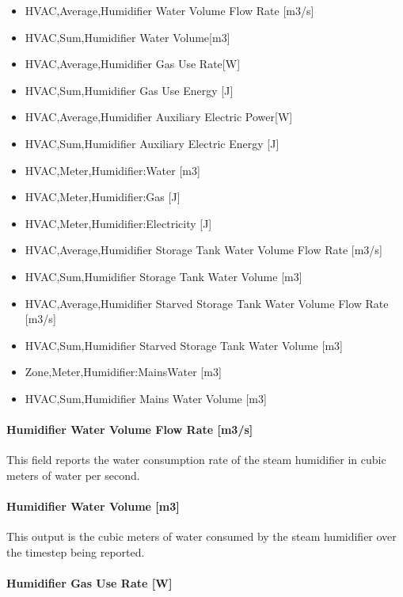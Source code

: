 \begin{itemize}
\tightlist
\item
  HVAC,Average,Humidifier Water Volume Flow Rate {[}m3/s{]}
\item
  HVAC,Sum,Humidifier Water Volume{[}m3{]}
\item
  HVAC,Average,Humidifier Gas Use Rate{[}W{]}
\item
  HVAC,Sum,Humidifier Gas Use Energy {[}J{]}
\item
  HVAC,Average,Humidifier Auxiliary Electric Power{[}W{]}
\item
  HVAC,Sum,Humidifier Auxiliary Electric Energy {[}J{]}
\item
  HVAC,Meter,Humidifier:Water {[}m3{]}
\item
  HVAC,Meter,Humidifier:Gas {[}J{]}
\item
  HVAC,Meter,Humidifier:Electricity {[}J{]}
\item
  HVAC,Average,Humidifier Storage Tank Water Volume Flow Rate {[}m3/s{]}
\item
  HVAC,Sum,Humidifier Storage Tank Water Volume {[}m3{]}
\item
  HVAC,Average,Humidifier Starved Storage Tank Water Volume Flow Rate {[}m3/s{]}
\item
  HVAC,Sum,Humidifier Starved Storage Tank Water Volume {[}m3{]}
\item
  Zone,Meter,Humidifier:MainsWater {[}m3{]}
\item
  HVAC,Sum,Humidifier Mains Water Volume {[}m3{]}
\end{itemize}

\paragraph{Humidifier Water Volume Flow Rate {[}m3/s{]}}\label{humidifier-water-volume-flow-rate-m3s-1}

This field reports the water consumption rate of the steam humidifier in cubic meters of water per second.

\paragraph{Humidifier Water Volume {[}m3{]}}\label{humidifier-water-volume-m3}

This output is the cubic meters of water consumed by the steam humidifier over the timestep being reported.

\paragraph{Humidifier Gas Use Rate {[}W{]}}\label{humidifier-gas-use-rate-w}

